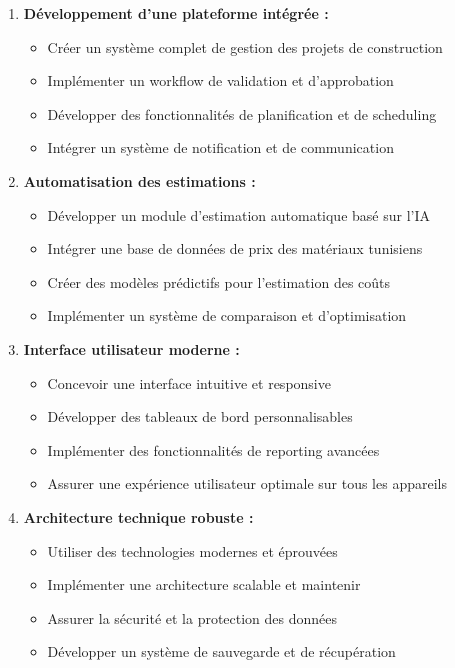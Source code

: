 \documentclass[12pt, a4paper]{report}
\begin{document}
\begin{enumerate}
    \item \textbf{Développement d'une plateforme intégrée :}
    \begin{itemize}
        \item Créer un système complet de gestion des projets de construction
        \item Implémenter un workflow de validation et d'approbation
        \item Développer des fonctionnalités de planification et de scheduling
        \item Intégrer un système de notification et de communication
    \end{itemize}
    
    \item \textbf{Automatisation des estimations :}
    \begin{itemize}
        \item Développer un module d'estimation automatique basé sur l'IA
        \item Intégrer une base de données de prix des matériaux tunisiens
        \item Créer des modèles prédictifs pour l'estimation des coûts
        \item Implémenter un système de comparaison et d'optimisation
    \end{itemize}
    
    \item \textbf{Interface utilisateur moderne :}
    \begin{itemize}
        \item Concevoir une interface intuitive et responsive
        \item Développer des tableaux de bord personnalisables
        \item Implémenter des fonctionnalités de reporting avancées
        \item Assurer une expérience utilisateur optimale sur tous les appareils
    \end{itemize}
    
    \item \textbf{Architecture technique robuste :}
    \begin{itemize}
        \item Utiliser des technologies modernes et éprouvées
        \item Implémenter une architecture scalable et maintenir
        \item Assurer la sécurité et la protection des données
        \item Développer un système de sauvegarde et de récupération
    \end{itemize}
\end{enumerate}
\end{document}

